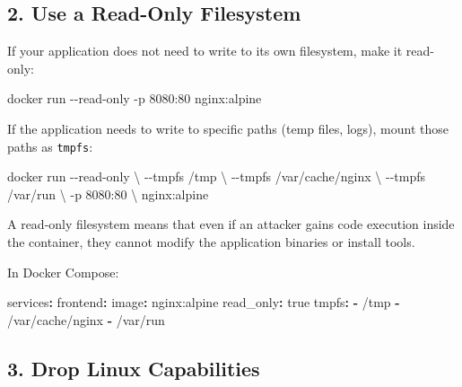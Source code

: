 \documentclass[11pt,american,a4paper,]{book}
\newenvironment{Shaded}{}{}
\newcommand{\AttributeTok}[1]{\textcolor[rgb]{0.49,0.56,0.16}{#1}}
\newcommand{\CharTok}[1]{\textcolor[rgb]{0.25,0.44,0.63}{#1}}
\newcommand{\FunctionTok}[1]{\textcolor[rgb]{0.02,0.16,0.49}{#1}}
\newcommand{\KeywordTok}[1]{\textcolor[rgb]{0.00,0.44,0.13}{\textbf{#1}}}
\newcommand{\NormalTok}[1]{#1}
\begin{document}
\subsection{2. Use a Read-Only
Filesystem}\label{use-a-read-only-filesystem}

If your application does not need to write to its own filesystem, make
it read-only:

\begin{Shaded}
\begin{Highlighting}[]
\NormalTok{docker run {-}{-}read{-}only {-}p 8080:80 nginx:alpine}
\end{Highlighting}
\end{Shaded}

If the application needs to write to specific paths (temp files, logs),
mount those paths as \texttt{tmpfs}:

\begin{Shaded}
\begin{Highlighting}[]
\NormalTok{docker run {-}{-}read{-}only \textbackslash{}}
\NormalTok{  {-}{-}tmpfs /tmp \textbackslash{}}
\NormalTok{  {-}{-}tmpfs /var/cache/nginx \textbackslash{}}
\NormalTok{  {-}{-}tmpfs /var/run \textbackslash{}}
\NormalTok{  {-}p 8080:80 \textbackslash{}}
\NormalTok{  nginx:alpine}
\end{Highlighting}
\end{Shaded}

A read-only filesystem means that even if an attacker gains code
execution inside the container, they cannot modify the application
binaries or install tools.

In Docker Compose:

\begin{Shaded}
\begin{Highlighting}[]
\FunctionTok{services}\KeywordTok{:}
\AttributeTok{  }\FunctionTok{frontend}\KeywordTok{:}
\AttributeTok{    }\FunctionTok{image}\KeywordTok{:}\AttributeTok{ nginx:alpine}
\AttributeTok{    }\FunctionTok{read\_only}\KeywordTok{:}\AttributeTok{ }\CharTok{true}
\AttributeTok{    }\FunctionTok{tmpfs}\KeywordTok{:}
\AttributeTok{      }\KeywordTok{{-}}\AttributeTok{ /tmp}
\AttributeTok{      }\KeywordTok{{-}}\AttributeTok{ /var/cache/nginx}
\AttributeTok{      }\KeywordTok{{-}}\AttributeTok{ /var/run}
\end{Highlighting}
\end{Shaded}

\subsection{3. Drop Linux Capabilities}\label{drop-linux-capabilities}
\end{document}
